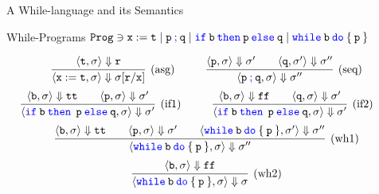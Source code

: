 \documentclass{beamer}
\newcommand{\blue}[1]{\textcolor{blue}{#1}}
\begin{document}
\begin{frame}{A While-language and its Semantics}
	\begin{block}{While-Programs}
	        $\mathtt{Prog} \ni \mathtt{x := t} \mid
	        \mathtt{p \> \blue{;} \> q} \mid
	        \mathtt{\blue{if} \> b \> \blue{then} \> p \> \blue{else} \> q} \mid
	        \mathtt{\blue{while} \> b \> \blue{do} \> \{ \> p \> \}}$
        \end{block} \vspace{-0.8cm}
        \[
                \infer[(\text{asg})]{
                        \langle \mathtt{x := t}, \sigma \rangle \Downarrow 
                        \sigma[\mathtt{r} / \mathtt{x}]
                }{
                       \langle \mathtt{t}, \sigma \rangle \Downarrow \mathtt{r}
                } \hspace{1cm}
                \infer[(\text{seq})]{
                        \langle \mathtt{p \> \blue{;} \> q}, \sigma \rangle \Downarrow \sigma''
                }{
                        \langle \mathtt{p}, \sigma \rangle \Downarrow \sigma' \qquad
                        \langle \mathtt{q}, \sigma' \rangle \Downarrow \sigma'' 
                }
        \]\vspace{0.001cm}
        \[\hspace{-0.6cm}
                \infer[(\text{if1})]{
                        \langle \mathtt{\blue{if} \> b \> \blue{then} \> \> p \> \blue{else} \> q}, 
                        \sigma \rangle \Downarrow \sigma'
                }{
                        \langle \mathtt{b}, \sigma \rangle \Downarrow \mathtt{tt} \qquad
                        \langle \mathtt{p}, \sigma \rangle \Downarrow \sigma'
                } \hspace{1cm} 
                \infer[(\text{if2})]{
                        \langle \mathtt{\blue{if} \> b \> \blue{then} \> \> p \> \blue{else} \> q}, 
                        \sigma \rangle \Downarrow \sigma'
                }{
                        \langle \mathtt{b}, \sigma \rangle \Downarrow \mathtt{ff} \qquad
                        \langle \mathtt{q}, \sigma \rangle \Downarrow \sigma'
                } 
        \]\vspace{0.001cm}
        \[
                \infer[(\text{wh1})]{
                        \langle \mathtt{\blue{while} \> b \> \blue{do} \> \{ \> p \> \}}, \sigma \rangle
                        \Downarrow \sigma''
                }{
                        \langle \mathtt{b}, \sigma \rangle \Downarrow \mathtt{tt} \qquad
                        \langle \mathtt{p}, \sigma \rangle \Downarrow \sigma' \qquad
                        \langle \mathtt{\blue{while} \> b \> \blue{do} \> \{ \> p \> \}}, \sigma'
                        \rangle \Downarrow \sigma'' 
                }
        \]\vspace{0.001cm}
        \[
                \infer[(\text{wh2})]{
                        \langle \mathtt{\blue{while} \> b \> \blue{do} \> \{ \> p \> \}}, \sigma \rangle
                        \Downarrow \sigma
                }{
                        \langle \mathtt{b}, \sigma \rangle \Downarrow \mathtt{ff}
                }
        \]
\end{frame}
\end{document}
